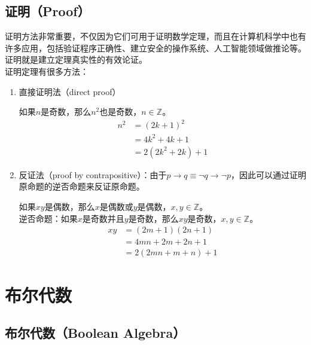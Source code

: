 \subsection{证明（Proof）}

证明方法非常重要，不仅因为它们可用于证明数学定理，而且在计算机科学中也有许多应用，包括验证程序正确性、建立安全的操作系统、人工智能领域做推论等。证明就是建立定理真实性的有效论证。\\

证明定理有很多方法：

\begin{enumerate}
	\item 直接证明法（direct proof）

	      \begin{tcolorbox}
		      如果$ n $是奇数，那么$ n^2 $也是奇数，$ n \in \mathbb{Z} $。
		      \begin{align*}
			      n^2 & = (2k + 1)^2       \\
			          & = 4k^2 + 4k + 1    \\
			          & = 2(2k^2 + 2k) + 1
		      \end{align*}
	      \end{tcolorbox}

	\item 反证法（proof by contrapositive）：由于$ p \rightarrow q \equiv \neg q \rightarrow \neg p $，因此可以通过证明原命题的逆否命题来反证原命题。

	      \begin{tcolorbox}
		      \mybox{证明}
		      如果$ xy $是偶数，那么$ x $是偶数或$ y $是偶数，$ x, y \in \mathbb{Z} $。\\
		      逆否命题：如果$ x $是奇数并且$ y $是奇数，那么$ xy $是奇数，$ x, y \in \mathbb{Z} $。
		      \begin{align*}
			      xy & = (2m + 1)(2n + 1)   \\
			         & = 4mn + 2m +2n + 1   \\
			         & = 2(2mn + m + n) + 1
		      \end{align*}
	      \end{tcolorbox}
\end{enumerate}

\newpage

\section{布尔代数}

\subsection{布尔代数（Boolean Algebra）}

